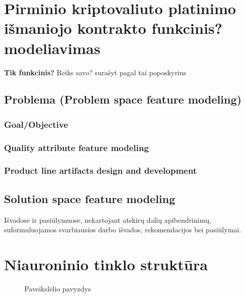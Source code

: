 \documentclass{VUMIFInfKursinis}
\begin{document}
\section{Pirminio kriptovaliuto platinimo išmaniojo kontrakto funkcinis? modeliavimas}
\textbf{Tik funkcinis?}
Reiks savo? surašyt pagal tai poposkyrius
\subsection{Problema (Problem space feature modeling)}
\subsubsection{Goal/Objective}
\subsubsection{Quality attribute feature modeling}
\subsubsection{Product line artifacts design and development}
\subsection{Solution space feature modeling}




Išvadose ir pasiūlymuose, nekartojant atskirų dalių apibendrinimų,
suformuluojamos svarbiausios darbo išvados, rekomendacijos bei pasiūlymai.

\printbibliography[heading=bibintoc] %

\appendix  %

\section{Niauroninio tinklo struktūra}
\begin{figure}[H]
    \centering
    \caption{Paveikslėlio pavyzdys}   %
    \label{img:mlp}
\end{figure}
\end{document}
